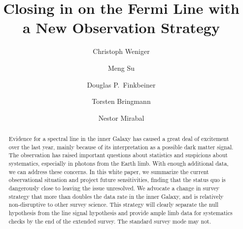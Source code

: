 \documentclass[aps,prd,superscriptaddress,nofootinbib,fixlfloat, 12pt]{revtex4-1}
\begin{document}
\title{Closing in on the Fermi Line with a New Observation Strategy}

\author{Christoph Weniger}

\author{Meng Su}

\author{Douglas P.~Finkbeiner}

\author{Torsten Bringmann}

\author{Nestor Mirabal}

\begin{abstract}
  Evidence for a spectral line in the inner Galaxy has caused a great deal of
  excitement over the last year, mainly because of its interpretation as a
  possible dark matter signal.  The observation has raised important questions
  about statistics and suspicions about systematics, especially in photons
  from the Earth limb.  With enough additional data, we can address these
  concerns.  In this white paper, we summarize the current
  observational situation and project future sensitivities, finding that the
  status quo is dangerously close to leaving the issue unresolved.  We
  advocate a change in survey strategy that more than doubles the data rate in
  the inner Galaxy, and is relatively non-disruptive to other survey science.  
  This strategy will clearly separate the null hypothesis from the line signal
  hypothesis and provide ample limb data for systematics checks by the end of
  the extended survey.  The standard survey mode may not. 

\end{abstract}
\end{document}

